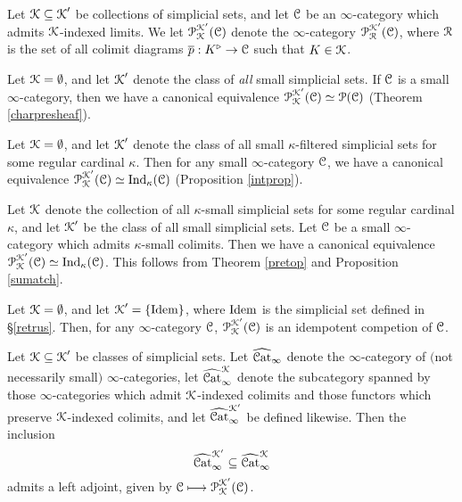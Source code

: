 \begin{definition}
Let $\calK \subseteq \calK'$ be collections of simplicial sets, and let $\calC$ be an $\infty$-category which admits $\calK$-indexed limits. We let $\calP^{\calK'}_{\calK}(\calC)$ denote the $\infty$-category $\calP^{\calK'}_{\calR}(\calC)$, where $\calR$ is the set of all colimit diagrams
$\overline{p}: K^{\triangleright} \rightarrow \calC$ such that $K \in \calK$.
\end{definition}

\begin{example}
Let $\calK = \emptyset$, and let $\calK'$ denote the class of {\em all} small simplicial sets.
If $\calC$ is a small $\infty$-category, then we have a canonical equivalence
$\calP^{\calK'}_{\calK}(\calC) \simeq \calP(\calC)$ (Theorem \ref{charpresheaf}).
\end{example}

\begin{example}
Let $\calK = \emptyset$, and let $\calK'$ denote the class of all small $\kappa$-filtered simplicial sets for some regular cardinal $\kappa$. Then for any small $\infty$-category $\calC$, we have a canonical equivalence
$\calP^{\calK'}_{\calK}(\calC) \simeq \Ind_{\kappa}(\calC)$ (Proposition \ref{intprop}).
\end{example}

\begin{example}
Let $\calK$ denote the collection of all $\kappa$-small simplicial sets for some regular cardinal $\kappa$, and let $\calK'$ be the class of all small simplicial sets. Let $\calC$ be a small $\infty$-category which admits $\kappa$-small colimits. Then we have a canonical equivalence
$\calP^{\calK'}_{\calK}(\calC) \simeq \Ind_{\kappa}(\calC)$. This follows from
Theorem \ref{pretop} and Proposition \ref{sumatch}.
\end{example}

\begin{example}
Let $\calK = \emptyset$, and let $\calK' = \{ \Idem \}$, where $\Idem$ is the simplicial set defined
in \S \ref{retrus}. Then, for any $\infty$-category $\calC$, $\calP^{\calK'}_{\calK}(\calC)$ is
an idempotent competion of $\calC$.
\end{example}

\begin{corollary}
Let $\calK \subseteq \calK'$ be classes of simplicial sets. Let $\widehat{\Cat}_{\infty}$ denote the $\infty$-category of $($not necessarily small$)$ $\infty$-categories, let
$\widehat{\Cat}_{\infty}^{\calK}$ denote the subcategory spanned by those $\infty$-categories
which admit $\calK$-indexed colimits and those functors which preserve $\calK$-indexed colimits, and let $\widehat{\Cat}_{\infty}^{\calK'}$ be defined likewise. Then the inclusion
$$ \widehat{ \Cat}_{\infty}^{\calK'} \subseteq \widehat{ \Cat}_{\infty}^{\calK}$$
admits a left adjoint, given by $\calC \mapsto \calP^{\calK'}_{\calK}(\calC)$.
\end{corollary}

